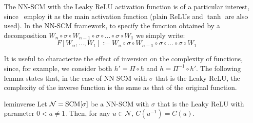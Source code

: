 \documentclass{article} %
\begin{document}
 

The NN-SCM with the Leaky ReLU activation function is of a particular interest, since~\citep{discogan,CycleGAN2017} employ it as the main activation function (plain ReLUs and $\tanh$ are also used). In the NN-SCM framework, to specify the function obtained by a decomposition  $W_{n} \circ \sigma \circ W_{n-1} \circ \sigma \circ ... \circ \sigma \circ W_1$ we simply write:
\begin{equation}
F[W_{n},...,W_1] := W_{n} \circ \sigma \circ W_{n-1} \circ \sigma \circ ... \circ \sigma \circ W_1
\end{equation}

It is useful to characterize the effect of inversion on the complexity of functions, since, for example, we consider both $h'=\Pi \circ h$ and $h=\Pi^{-1} \circ h'$. The following lemma states that, in the case of NN-SCM with $\sigma$ that is the Leaky ReLU, the complexity of the inverse function is the same as that of the original function.

\begin{restatable}{lem}{inverse}\label{lem:inverse}
Let $\mathcal{N} = \textnormal{SCM}[\sigma]$ be a NN-SCM with $\sigma$ that is the Leaky ReLU with parameter $0<a \neq 1$. Then, for any $u\in \mathcal{N}$, $C(u^{-1}) = C(u)$.
\end{restatable}
\end{document}
